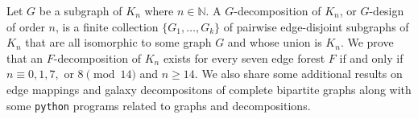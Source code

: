 
Let $G$ be a subgraph of $K_n$ where $n \in \mathbb{N}$. A $G$-decomposition of $K_n$, or $G$-design of order $n$, is a finite collection $\{G_{1}, \hdots, G_{k}\}$ of pairwise edge-disjoint subgraphs of $K_n$ that are all isomorphic to some graph $G$ and whose union is $K_{n}$. We prove that an $F$-decomposition of $K_n$ exists for every seven edge forest $F$ if and only if $n \equiv 0,1,7, \text{ or } 8 \pmod{14}$ and $n\geq 14$. We also share some additional results on edge mappings and galaxy decompositons of complete bipartite graphs along with some \verb|python| programs related to graphs and decompositions.

